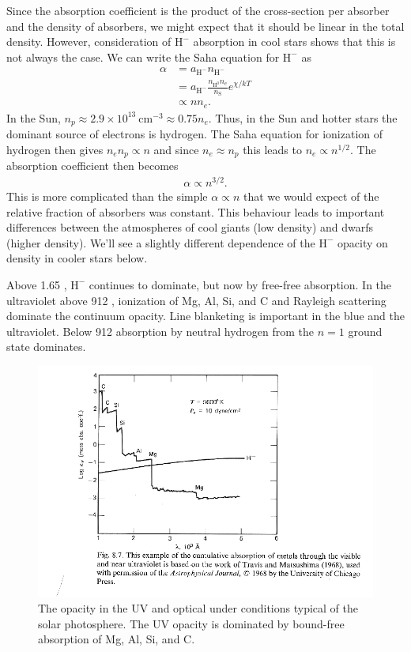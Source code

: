 Since the absorption coefficient is the product of the
cross-section per absorber and the density of absorbers, we
might expect that it should be linear in the total density.
However, consideration of $\mathrm{H^-}$ absorption in cool
stars shows that this is not always the case. We can write
the Saha equation for $\mathrm{H^-}$ as
\begin{align}
\alpha 
&= 
a_\mathrm{H^-} n_\mathrm{H^-}\\
&= 
a_\mathrm{H^-}\frac{n_\mathrm{H^0} n_e}{n_\mathrm{S}}e^{\chi/kT}\\
&\propto n n_e.
\end{align}
In the Sun, $n_p
\approx 2.9 \times 10^{13}\:\mathrm{cm^{-3}} \approx 0.75 n_e$.
Thus, in the Sun and hotter stars the dominant source of
electrons is hydrogen. The Saha
equation for ionization of hydrogen then gives $n_e n_p
\propto n$ and since $n_e \approx n_p$ this leads to $n_e \propto
n^{1/2}$. The absorption coefficient then becomes
\begin{align}
\alpha \propto n^{3/2}.
\end{align}
This is more complicated than the simple $\alpha \propto
n$ that we would expect of the relative fraction of
absorbers was constant. This behaviour leads to important
differences between the atmospheres of cool giants (low
density) and dwarfs (higher density).
We'll see a slightly different
dependence of the $\mathrm{H^-}$ opacity on density in
cooler stars below.

Above 1.65 {\micron}, $\mathrm{H^-}$ continues to dominate,
but now by free-free absorption. In the ultraviolet above
912 {\Angstrom}, ionization of Mg, Al, Si, and C and
Rayleigh scattering dominate the continuum opacity. Line
blanketing is important in the blue and the ultraviolet. Below
912 {\Angstrom} absorption by neutral hydrogen from the
$n=1$ ground state dominates.

\begin{figure}
\centering
\includegraphics[width=0.7\linewidth]{figures/opacity-uv.pdf}
\caption{The opacity in the UV and optical under conditions typical of the solar photosphere. The UV opacity is dominated by bound-free absorption of Mg, Al, Si, and C.}
\end{figure}

